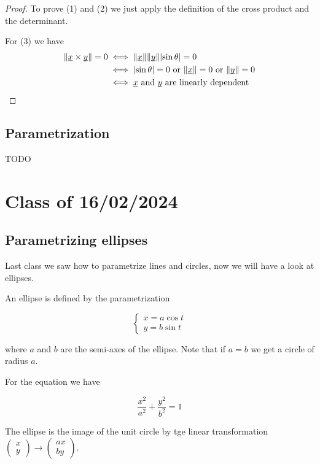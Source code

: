 \documentclass[10pt]{extarticle}
\newcommand{\munderbar}[1]{\underbar{\ensuremath{#1}}}
\begin{document}
\begin{proof}
    To prove (1) and (2) we just apply the definition of the cross product and the determinant.

    For (3) we have
    \begin{align*}
        \norm{\munderbar{x} \times \munderbar{y}} = 0
         & \iff
        \norm {\munderbar{x}} \norm{\munderbar{y}} \abs{\sin \theta} = 0                                        \\
         & \iff \abs{\sin \theta} = 0 \text{ or } \norm{\munderbar{x}} = 0 \text{ or } \norm{\munderbar{y}} = 0 \\
         & \iff \munderbar{x} \text{ and } \munderbar{y} \text{ are linearly dependent}
    \end{align*}

\end{proof}

\subsection{Parametrization}

TODO

\section{Class of 16/02/2024}

\subsection{Parametrizing ellipses}

Last class we saw how to parametrize lines and circles, now we will have a look at ellipses.

An ellipse is defined by the parametrization

\[
    \begin{cases}
        x = a \cos t \\
        y = b \sin t
    \end{cases}
\]

where $a$ and $b$ are the semi-axes of the ellipse. Note that if $a = b$ we get a circle of radius $a$.

For the equation we have

$$
    \frac{x^2}{a^2} + \frac{y^2}{b^2} = 1
$$

The ellipse is the image of the unit circle by tge linear transformation $\begin{pmatrix}
        x \\ y
    \end{pmatrix} \to \begin{pmatrix}
        ax \\ by
    \end{pmatrix}$.
\end{document}
